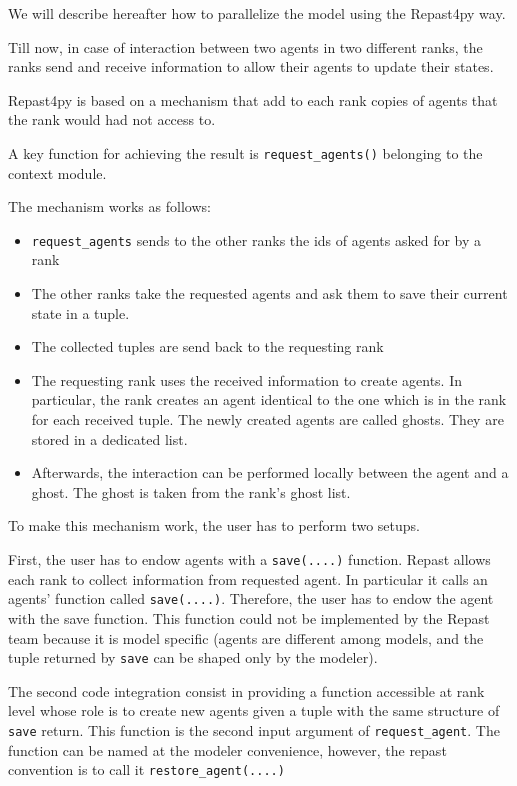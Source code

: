 \documentclass{article}
\providecommand{\tightlist}{%
  \setlength{\itemsep}{0pt}\setlength{\parskip}{0pt}}
\begin{document}
We will describe hereafter how to parallelize the model using the Repast4py way.

Till now, in case of interaction between two agents in two different ranks, the ranks send and receive information to allow their agents to update their states.

Repast4py is based on a mechanism that add to each rank copies of agents that the rank would had not access to.

A key function for achieving the result is \verb+request_agents()+ belonging to the context module.

The mechanism works as follows:

\begin{itemize}
	\tightlist
	\item 
\verb+request_agents+ sends to the other ranks the ids of agents asked for by a rank
	\item 
The other ranks take the requested agents and ask them to save their current state in a tuple.
	\item 
The collected tuples are send back to the requesting rank
	\item 
		The requesting rank uses the received information to create agents. In particular, the rank creates an agent identical to the one which is in the rank for each received tuple. The newly created agents are called ghosts. They are stored in a dedicated list.
	\item 
		Afterwards, the interaction can be performed locally between the agent and a ghost. The ghost is taken from the rank's ghost list.
\end{itemize}

To make this mechanism work, the user has to perform two setups.

First, the user has to endow agents with a \verb+save(....)+ function.
Repast allows each rank to collect information from requested agent. In particular it calls an agents' function called \verb+save(....)+.
Therefore, the user has to endow the agent with the save function. This function could not be implemented by the Repast team because it is model specific (agents are different among models, and the tuple returned by \verb+save+ can be shaped only by the modeler).

The second code integration consist in providing a function accessible at rank level whose role is to create new agents given a tuple with the same structure of \verb+save+ return. This function is the second input argument of \verb+request_agent+. The function can be named at the modeler convenience, however, the repast convention is to call it \verb+restore_agent(....)+   
\end{document}

